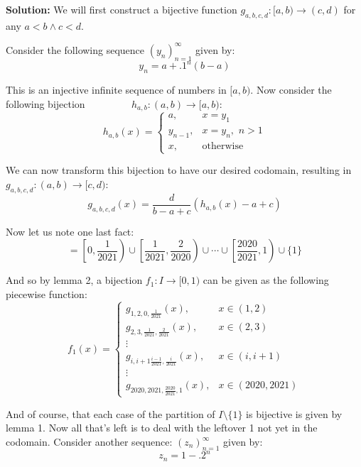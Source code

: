 \documentclass{article}
\begin{document}
\noindent\textbf{Solution:} We will first construct a bijective function $g_{a,b,c,d}:[a,b)\to(c,d)$ for any $a<b\wedge c<d$.
\medskip

Consider the following sequence $(y_n)_{n=1}^\infty$ given by:
\begin{equation*}
  y_n=a+.1^{n}(b-a)
\end{equation*}

This is an injective infinite sequence of numbers in $[a,b)$. Now consider the following bijection $\qquad \qquad$ $h_{a,b}:(a,b)\to[a,b)$:
\begin{equation*}
  h_{a,b}(x)=\begin{cases}
    a, &x=y_1\\
    y_{n-1},&x=y_n,\,\,n>1\\
    x,&\text{otherwise}
  \end{cases}
\end{equation*}

We can now transform this bijection to have our desired codomain, resulting in $g_{a,b,c,d}:(a,b)\to[c,d)$:
\begin{equation*}
  g_{a,b,c,d}(x)=\frac{d}{b-a+c}(h_{a,b}(x)-a+c)\tag{call this lemma 1}
\end{equation*}
\medskip

Now let us note one last fact:
\begin{equation*}
  [0,1]=\left[0,\frac{1}{2021}\right)\cup\left[\frac{1}{2021},\frac{2}{2020}\right)\cup\cdots\cup\left[\frac{2020}{2021},1\right)\tag{call this lemma 2}\cup\{1\}
\end{equation*}

And so by lemma 2, a bijection $f_1:I\to[0,1)$ can be given as the following piecewise function:
$$f_1(x)=\begin{cases}
  g_{1,2,0,\frac{1}{2021}}(x),&x\in(1,2)\\
  g_{2,3,\frac{1}{2021},\frac{2}{2021}}(x),&x\in(2,3)\\
  \vdots\\
  g_{i,i+1\frac{i-1}{2021},\frac{i}{2021}}(x),&x\in(i,i+1)\\
  \vdots\\
  g_{2020,2021,\frac{2020}{2021},1}(x),&x\in(2020,2021)
\end{cases}$$

And of course, that each case of the partition of $I\setminus\{1\}$ is bijective is given by lemma 1. Now all that's left is to deal with the leftover 1 not yet in the codomain. Consider another sequence:
$(z_n)_{n=1}^\infty$ given by:
\begin{equation*}
  z_n=1-.2^{n}
\end{equation*}
\end{document}
